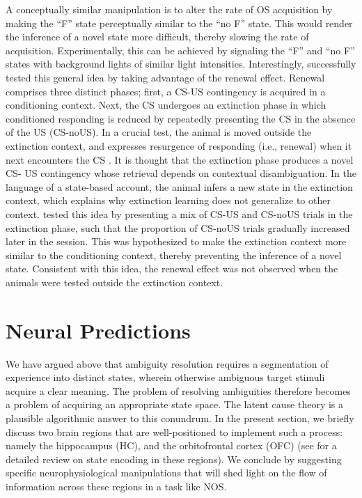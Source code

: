 \documentclass[11pt]{article}
\let\cite=\citep
\let\citeN=\citet
\let\citeNP=\citealt
\begin{document}
A conceptually similar manipulation is to alter the rate of OS acquisition by 
making the ``F'' state perceptually similar to the ``no F'' state. This would 
render the inference of a novel state more difficult, thereby slowing the rate 
of acquisition. Experimentally, this can be achieved by signaling the ``F'' and 
``no F'' states with background lights of similar light intensities. 
Interestingly, \citeN{Gershman2013} successfully tested this general idea by 
taking advantage of the renewal effect. Renewal comprises three distinct phases; 
first, a CS-US contingency is acquired in a conditioning context. Next, the CS 
undergoes an extinction phase in which conditioned responding is reduced by 
repeatedly presenting the CS in the absence of the US (CS-noUS). In a crucial 
test, the animal is moved outside the extinction context, and expresses 
resurgence of responding (i.e., renewal) when it next encounters the CS 
\cite{Bouton2004}. It is thought that the extinction phase produces a novel CS-
US contingency whose retrieval depends on contextual disambiguation. In the 
language of a state-based account, the animal infers a new state in the 
extinction context, which explains why extinction learning does not generalize 
to other context. \citeN{Gershman2013} tested this idea by presenting a mix of 
CS-US and CS-noUS trials in the extinction phase, such that the proportion of 
CS-noUS trials gradually increased later in the session. This was hypothesized 
to make the extinction context more similar to the conditioning context, thereby 
preventing the inference of a novel state. Consistent with this idea, the 
renewal effect was not observed when the animals were tested outside the 
extinction context.  

\section*{Neural Predictions}

We have argued above that ambiguity resolution requires a segmentation of
experience into distinct states, wherein otherwise ambiguous target stimuli 
acquire a clear meaning. The problem of resolving ambiguities therefore becomes 
a problem of acquiring an appropriate state space. The latent cause theory is a 
plausible algorithmic answer to this conundrum. In the present section, we 
briefly discuss two brain regions that are well-positioned to implement such a 
process: namely the hippocampus (HC), and the orbitofrontal cortex (OFC) (see 
\citeNP{Wikenheiser2016} for a detailed review on state encoding in these 
regions). We conclude by suggesting specific neurophysiological manipulations 
that will shed light on the flow of information across these regions in a task 
like NOS. 
\end{document}
